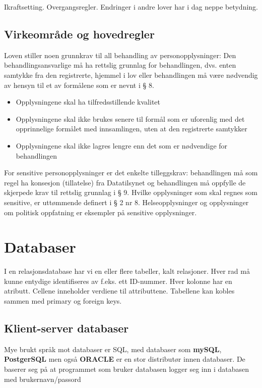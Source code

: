\documentclass[11pt]{article}
\begin{document}
    Ikraftsetting. Overgangsregler. Endringer i andre lover har i dag neppe betydning.
\subsection{Virkeområde og hovedregler}
\label{sec-17.3}

   Loven stiller noen grunnkrav til all behandling av personopplysninger:
   Den behandlingsansvarlige må ha rettslig grunnlag for behandlingen, dvs. enten samtykke fra den registrerte, hjemmel i lov eller behandlingen må være nødvendig av hensyn til et av formålene som er nevnt i § 8.
\begin{itemize}
\item Opplysningene skal ha tilfredsstillende kvalitet
\item Opplysningene skal ikke brukes senere til formål som er uforenlig med det
     opprinnelige formålet med innsamlingen, uten at den registrerte samtykker
\item Opplysningene skal ikke lagres lengre enn det som er nødvendige for behandlingen
\end{itemize}

   For sensitive personopplysninger er det enkelte tilleggskrav:
   behandlingen må som regel ha konsesjon (tillatelse) fra Datatilsynet og behandlingen
   må oppfylle de skjerpede krav til rettslig grunnlag i § 9. Hvilke opplysninger som
   skal regnes som sensitive, er uttømmende definert i § 2 nr 8. Helseopplysninger og
   opplysninger om politisk oppfatning er eksempler på sensitive opplysninger.
\section{Databaser}
\label{sec-18}

  I en relasjonsdatabase har vi en eller flere tabeller, kalt relasjoner. 
  Hver rad må kunne entydige identifiseres av f.eks. ett ID-nummer. Hver kolonne
  har en atributt. Cellene inneholder verdiene til attributtene. Tabellene kan 
  kobles sammen med primary og foreign keys. 
\subsection{Klient-server databaser}
\label{sec-18.1}

   Mye brukt språk mot databaser er SQL, med databaser som \textbf{mySQL}, \textbf{PostgerSQL}
   men også \textbf{ORACLE} er en stor distributør innen databaser. De baserer seg på at
   programmet som bruker databasen logger seg inn i databasen med brukernavn/passord
\end{document}
